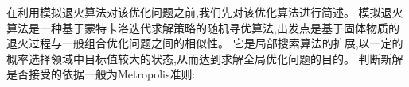 在利用模拟退火算法对该优化问题之前,我们先对该优化算法进行简述。
模拟退火算法是一种基于蒙特卡洛迭代求解策略的随机寻优算法,出发点是基于固体物质的退火过程与一般组合优化问题之间的相似性。
它是局部搜索算法的扩展,以一定的概率选择领域中目标值较大的状态,从而达到求解全局优化问题的目的。
判断新解是否接受的依据一般为Metropolis准则:
